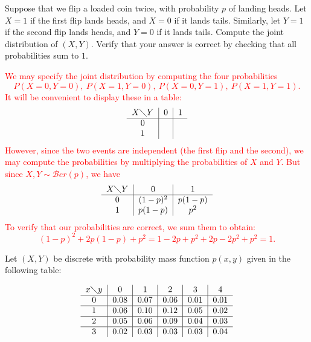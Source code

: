 \documentclass[12pt,reqno]{amsart}
\begin{document}
\bigskip

\prob Suppose that we flip a loaded coin twice, with probability $p$ of landing heads. Let $X=1$ if the first flip lands heads, and $X=0$ if it lands tails. Similarly, let $Y=1$ if the second flip lands heads, and $Y=0$ if it lands tails. Compute the joint distribution of $(X,Y)$. Verify that your answer is correct by checking that all probabilities sum to $1$.

\bigskip
\textcolor{red}{We may specify the joint distribution by computing the four probabilities
    \[P(X=0, Y=0),\ P(X=1, Y=0),\ P(X=0, Y=1), \ P(X=1, Y=1).\]
It will be convenient to display these in a table:
\[\begin{tabular}{c|c|c}
$X \diagdown Y$ & 0 & 1  \\ \hline
0 & \\
1 & 
\end{tabular}\]
However, since the two events are independent (the first flip and the second), we may compute the probabilities by multiplying the probabilities of $X$ and $Y$. But since $X,Y\sim \mathcal{B}er(p)$, we have
\[\begin{tabular}{c|c|c}
$X \diagdown Y$ & 0 & 1  \\ \hline
0 & $(1-p)^2$ & $p(1-p)$ \\
1 & $p(1-p)$ & $p^2$
\end{tabular}\]
To verify that our probabilities are correct, we sum them to obtain:
    \[(1-p)^2 + 2p(1-p) + p^2 = 1 - 2p + p^2 + 2p - 2p^2 + p^2 = 1.\]}












    \bigskip
\prob Let $(X,Y)$ be discrete with probability mass function $p(x,y)$ given in the following table:


\[\begin{tabular}{c|c|c|c|c|c}
$x \diagdown y$ & 0 & 1 & 2 & 3 & 4  \\ \hline
0 & 0.08 & 0.07 & 0.06 & 0.01 & 0.01 \\ \hline
1 & 0.06 & 0.10 & 0.12 & 0.05 & 0.02 \\ \hline
2 & 0.05 & 0.06 & 0.09 & 0.04 & 0.03 \\ \hline
3 & 0.02 & 0.03 & 0.03 & 0.03 & 0.04 
\end{tabular}\]
\end{document}
